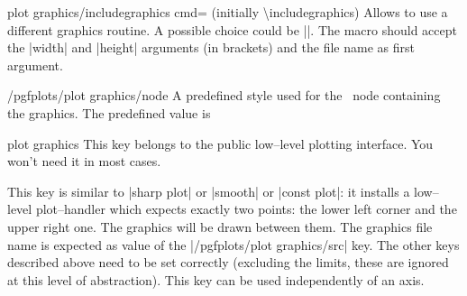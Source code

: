 {{
\begin{pgfplotskey}{plot graphics/includegraphics cmd= (initially \textbackslash includegraphics)}
	Allows to use a different graphics routine. A possible choice could be |\pgfimage|. The macro should accept the |width| and |height| arguments (in brackets) and the file name as first argument.
\end{pgfplotskey}
\begin{stylekey}{/pgfplots/plot graphics/node}
	A predefined style used for the \Tikz\ node containing the graphics. The predefined value is
\begin{codeexample}
\end{codeexample}
\end{stylekey}

\begin{pgfplotskey}{plot graphics}
	This key belongs to the public low--level plotting interface. You won't need it in most cases.

	This key is similar to |sharp plot| or |smooth| or |const plot|: it installs a low--level plot--handler which expects exactly two points: the lower left corner and the upper right one. The graphics will be drawn between them. The graphics file name is expected as value of the |/pgfplots/plot graphics/src| key. The other keys described above need to be set correctly (excluding the limits, these are ignored at this level of abstraction). This key can be used independently of an axis.
\end{pgfplotskey}

}}
